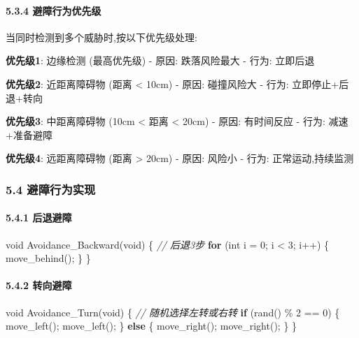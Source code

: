 \documentclass[
]{article}
\newenvironment{Shaded}{}{}
\newcommand{\CommentTok}[1]{\textcolor[rgb]{0.38,0.63,0.69}{\textit{#1}}}
\newcommand{\ControlFlowTok}[1]{\textcolor[rgb]{0.00,0.44,0.13}{\textbf{#1}}}
\newcommand{\DataTypeTok}[1]{\textcolor[rgb]{0.56,0.13,0.00}{#1}}
\newcommand{\DecValTok}[1]{\textcolor[rgb]{0.25,0.63,0.44}{#1}}
\newcommand{\NormalTok}[1]{#1}
\begin{document}
\hypertarget{ux907fux969cux884cux4e3aux4f18ux5148ux7ea7}{%
\paragraph{5.3.4
避障行为优先级}\label{ux907fux969cux884cux4e3aux4f18ux5148ux7ea7}}

当同时检测到多个威胁时,按以下优先级处理:

\textbf{优先级1}: 边缘检测 (最高优先级) - 原因: 跌落风险最大 - 行为:
立即后退

\textbf{优先级2}: 近距离障碍物 (距离 \textless{} 10cm) - 原因:
碰撞风险大 - 行为: 立即停止+后退+转向

\textbf{优先级3}: 中距离障碍物 (10cm \textless{} 距离 \textless{} 20cm)
- 原因: 有时间反应 - 行为: 减速+准备避障

\textbf{优先级4}: 远距离障碍物 (距离 \textgreater{} 20cm) - 原因: 风险小
- 行为: 正常运动,持续监测

\hypertarget{ux907fux969cux884cux4e3aux5b9eux73b0}{%
\subsubsection{5.4
避障行为实现}\label{ux907fux969cux884cux4e3aux5b9eux73b0}}

\hypertarget{ux540eux9000ux907fux969c}{%
\paragraph{5.4.1 后退避障}\label{ux540eux9000ux907fux969c}}

\begin{Shaded}
\begin{Highlighting}[]
\DataTypeTok{void}\NormalTok{ Avoidance\_Backward(}\DataTypeTok{void}\NormalTok{)}
\NormalTok{\{}
    \CommentTok{// 后退3步}
    \ControlFlowTok{for}\NormalTok{ (}\DataTypeTok{int}\NormalTok{ i = }\DecValTok{0}\NormalTok{; i \textless{} }\DecValTok{3}\NormalTok{; i++) \{}
\NormalTok{        move\_behind();}
\NormalTok{    \}}
\NormalTok{\}}
\end{Highlighting}
\end{Shaded}

\hypertarget{ux8f6cux5411ux907fux969c}{%
\paragraph{5.4.2 转向避障}\label{ux8f6cux5411ux907fux969c}}

\begin{Shaded}
\begin{Highlighting}[]
\DataTypeTok{void}\NormalTok{ Avoidance\_Turn(}\DataTypeTok{void}\NormalTok{)}
\NormalTok{\{}
    \CommentTok{// 随机选择左转或右转}
    \ControlFlowTok{if}\NormalTok{ (rand() \% }\DecValTok{2}\NormalTok{ == }\DecValTok{0}\NormalTok{) \{}
\NormalTok{        move\_left();}
\NormalTok{        move\_left();}
\NormalTok{    \} }\ControlFlowTok{else}\NormalTok{ \{}
\NormalTok{        move\_right();}
\NormalTok{        move\_right();}
\NormalTok{    \}}
\NormalTok{\}}
\end{Highlighting}
\end{Shaded}
\end{document}
